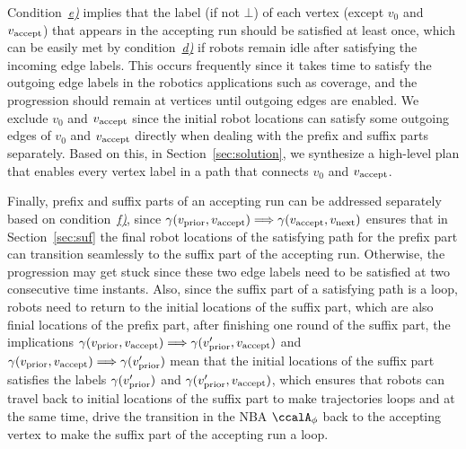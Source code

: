 \documentclass[Afour,sageh,times]{sagej}
\newcommand{\autop}{\ccalA_{\phi}}
\newcommand{\vertex}[1]{v_{\textup{#1}}}
\newcommand{\simplies}{\DOTSB\Longrightarrow}
\begin{document}
      Condition~\hyperref[cond:e]{\it e)} implies that the label (if not $\bot$) of each vertex (except $v_0$ and $\vertex{accept}$) that appears in the accepting run should be satisfied at least once, which can be easily met by condition~\hyperref[cond:d]{\it d)} if robots remain idle after satisfying the incoming edge labels. This occurs frequently since it takes time to satisfy the outgoing edge labels in the robotics applications  such as coverage, and the progression should remain at vertices until  outgoing edges are enabled. We exclude $v_0$ and $\vertex{accept}$ since the initial robot locations can satisfy some outgoing edges of $v_0$ and $\vertex{accept}$ directly when dealing with the prefix and suffix parts separately. Based on this, in Section~\ref{sec:solution}, we synthesize a high-level plan that enables every vertex label in a path that connects $v_0$ and $\vertex{accept}$.

      Finally, prefix and suffix parts of an accepting run can be addressed separately based on condition~\hyperref[cond:f]{\it f)}, since  $\gamma(\vertex{prior}, \vertex{accept}) \simplies  \gamma(\vertex{accept}, \vertex{next})$  ensures that in Section~\ref{sec:suf} the final robot locations of the satisfying path for  the prefix part can transition seamlessly to the suffix part of the accepting run. Otherwise, the progression may get stuck since these two edge labels need to be satisfied at two consecutive time instants. Also, since the suffix part of a satisfying path is a loop, robots need to return to the initial locations of the suffix part, which are also  finial locations of the prefix part, after finishing one round of the suffix part, the implications $\gamma(\vertex{prior}, \vertex{accept}) \simplies  \gamma(\vertex{prior}', \vertex{accept})$ and $\gamma(\vertex{prior}, \vertex{accept}) \simplies \gamma(\vertex{prior}')$ mean that the initial locations of the suffix part satisfies the labels $ \gamma(\vertex{prior}')$ and $\gamma(\vertex{prior}', \vertex{accept})$, which ensures that robots can travel back to initial locations of the suffix part  to make trajectories loops and at the same time, drive the transition in the NBA $\autop$ back to the accepting vertex to make the suffix part of the accepting run  a loop.
\end{document}
